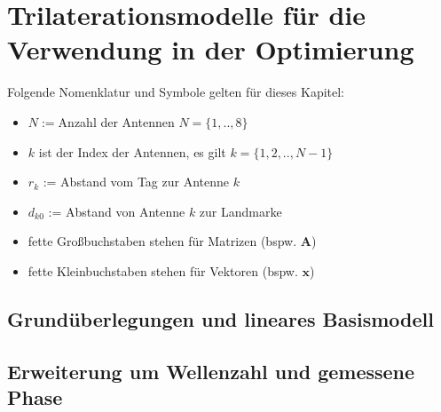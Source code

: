 \documentclass[a4paper,12pt,fleqn]{book}
\begin{document}
\setlength{\headheight}{36pt}


\chapter{Trilaterationsmodelle für die Verwendung in der Optimierung}

Folgende Nomenklatur und Symbole gelten für dieses Kapitel:
\begin{itemize}[itemsep=0mm]
	\item	$N:=$Anzahl der Antennen $N=\{1,..,8\}$
	\item	$k$ ist der Index der Antennen, es gilt $k = \{1,2,..,N-1\}$
	\item	$r_{k}$ := Abstand vom Tag zur Antenne $k$
	\item	$d_{k0}$ := Abstand von Antenne $k$ zur Landmarke
	\item	fette Großbuchstaben stehen für Matrizen (bspw. $\mathbf{A}$)
	\item	fette Kleinbuchstaben stehen für Vektoren (bspw. $\mathbf{x}$)
\end{itemize}

\section[modA]{Grundüberlegungen und lineares Basismodell}


\section[modB]{Erweiterung um Wellenzahl und gemessene Phase}


\end{document}
